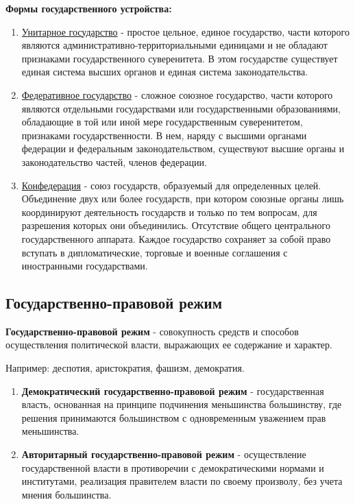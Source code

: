 \documentclass[a5paper,10pt]{article}
\begin{document}
			\textbf{Формы государственного устройства:}
			\begin{enumerate}
				\item \underline{Унитарное государство} - простое цельное, единое государство, части которого являются административно-территориальными единицами и не обладают признаками государственного суверенитета. В этом государстве существует единая система высших органов и единая система законодательства.
				
				\item \underline{Федеративное государство} - сложное союзное государство, части которого являются отдельными государствами или государственными образованиями, обладающие в той или иной мере государственным суверенитетом, признаками государственности. В нем, наряду с высшими органами федерации и федеральным законодательством, существуют высшие органы и законодательство частей, членов федерации.
				
				\item \underline{Конфедерация} - союз государств, образуемый для определенных целей. Объединение двух или более государств, при котором союзные органы лишь координируют деятельность государств и только по тем вопросам, для разрешения которых они объединились. Отсутствие общего центрального государственного аппарата. Каждое государство сохраняет за собой право вступать в дипломатические, торговые и военные соглашения с иностранными государствами.
			\end{enumerate}

		\subsection{Государственно-правовой режим}
			\textbf{Государственно-правовой режим} - совокупность средств и способов осуществления политической власти, выражающих ее содержание и характер.
			\begin{framed}
				Например: деспотия, аристократия, фашизм, демократия.
			\end{framed}

			\begin{enumerate}			
				\item \textbf{Демократический государственно-правовой режим} - государственная власть, основанная на принципе подчинения меньшинства большинству, где решения принимаются большинством с одновременным уважением прав меньшинства.

				\item \textbf{Авторитарный государственно-правовой режим} - осуществление государственной власти в противоречии с демократическими нормами и институтами, реализация правителем власти по своему произволу, без учета мнения большинства.
			\end{enumerate}
\end{document}

